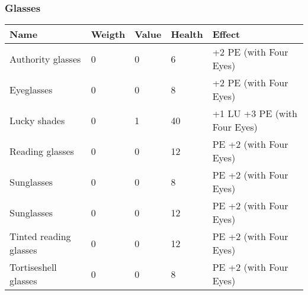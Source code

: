 
\subsubsection{Glasses}
\begin{longtable}{|p{5cm}|p{1.2cm}|p{1.2cm}|p{1.2cm}|p{6.4cm}|}
\hline
\bfseries Name & \bfseries Weigth & \bfseries Value & \bfseries Health & \bfseries Effect \\
\hline
\endhead
Authority glasses & 0 & 0 & 6 & +2 PE (with Four Eyes) \\
Eyeglasses & 0 & 0 & 8 & +2 PE (with Four Eyes) \\
Lucky shades & 0 & 1 & 40 &  +1 LU +3 PE (with Four Eyes) \\
Reading glasses & 0 & 0 & 12 & PE +2 (with Four Eyes) \\
Sunglasses & 0 & 0 & 8 & PE +2 (with Four Eyes) \\
Sunglasses & 0 & 0 & 12 & PE +2 (with Four Eyes) \\
Tinted reading glasses & 0 & 0 & 12 & PE +2 (with Four Eyes) \\
Tortiseshell glasses & 0 & 0 & 8 & PE +2 (with Four Eyes) \\
\hline
\end{longtable}
